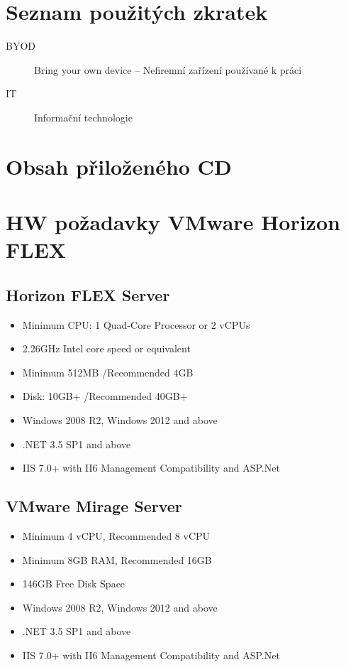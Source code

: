 \chapter{Seznam použitých zkratek}
\begin{description}
	\item[BYOD] Bring your own device -- Nefiremní zařízení používané k práci
	\item[IT] Informační technologie
\end{description}

%


\chapter{Obsah přiloženého CD}
 
 
\chapter{HW požadavky VMware Horizon FLEX}\label{pozadavky}

\section{Horizon FLEX Server}
\begin{itemize}
\item Minimum CPU: 1 Quad-Core Processor or 2 vCPUs
\item 2.26GHz Intel core speed or equivalent
\item Minimum 512MB /Recommended 4GB
\item Disk: 10GB+ /Recommended 40GB+
\item Windows 2008 R2, Windows 2012 and above
\item .NET 3.5 SP1 and above
\item IIS 7.0+ with II6 Management Compatibility and ASP.Net
\end{itemize}

\section{VMware Mirage Server}
\begin{itemize}
\item  Minimum 4 vCPU, Recommended 8 vCPU
\item Minimum 8GB RAM, Recommended 16GB
\item  146GB Free Disk Space
\item Windows 2008 R2, Windows 2012 and above
\item .NET 3.5 SP1 and above
\item IIS 7.0+ with II6 Management Compatibility and ASP.Net 
\end{itemize}